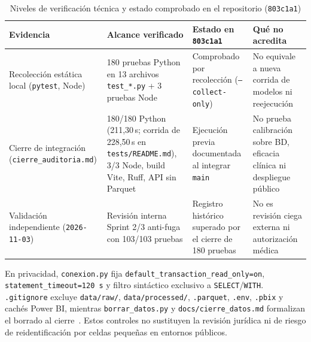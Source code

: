\begin{table}[t]
\caption{Niveles de verificación técnica y estado comprobado en el repositorio (\texttt{803c1a1})}
\label{tab:evidencia_pruebas}
\centering
\footnotesize
\begin{tabularx}{\textwidth}{@{}L{0.21\textwidth} L{0.27\textwidth} L{0.22\textwidth} Y@{}}
\toprule
Evidencia & Alcance verificado & Estado en \texttt{803c1a1} & Qué no acredita \\
\midrule
Recolección estática local (\texttt{pytest}, Node) & 180 pruebas Python en 13 archivos \texttt{test\_*.py} + 3 pruebas Node & Comprobado por recolección (\texttt{--collect-only}) & No equivale a nueva corrida de modelos ni reejecución \\
Cierre de integración (\nolinkurl{cierre_auditoria.md}) & 180/180 Python (211,30\,s; corrida de 228,50\,s en \nolinkurl{tests/README.md}), 3/3 Node, build Vite, Ruff, API sin Parquet & Ejecución previa documentada al integrar \texttt{main} & No prueba calibración sobre BD, eficacia clínica ni despliegue público \\
Validación independiente (\texttt{2026-11-03}) & Revisión interna Sprint 2/3 anti-fuga con 103/103 pruebas & Registro histórico superado por el cierre de 180 pruebas & No es revisión ciega externa ni autorización médica \\
\bottomrule
\end{tabularx}
\end{table}

En privacidad, \texttt{conexion.py} fija \texttt{default\_transaction\_read\_only=on}, \texttt{statement\_timeout=120\,s} y filtro sintáctico exclusivo a \texttt{SELECT}/\texttt{WITH}. \texttt{.gitignore} excluye \texttt{data/raw/}, \texttt{data/processed/}, \texttt{.parquet}, \texttt{.env}, \texttt{.pbix} y cachés Power BI, mientras \texttt{borrar\_datos.py} y \texttt{docs/cierre\_datos.md} formalizan el borrado al cierre~\cite{mediflow2026auditoria}. Estos controles no sustituyen la revisión jurídica ni de riesgo de reidentificación por celdas pequeñas en entornos públicos.
